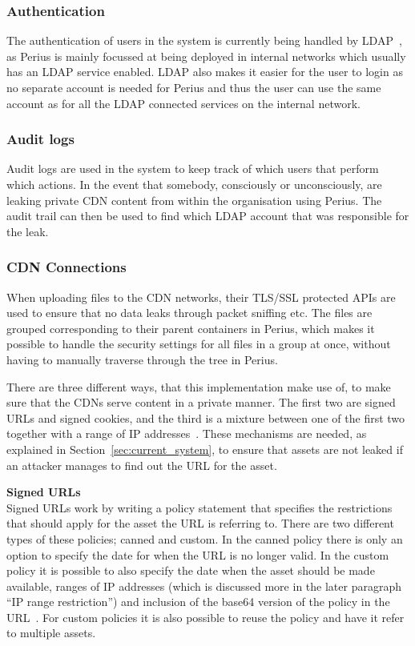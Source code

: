 \documentclass[a4paper,12pt]{article}
\newcounter{subsubsubsection}[subsubsection]
\begin{document}
\subsubsection{Authentication}
The authentication of users in the system is currently being handled by LDAP~\cite{LDAP}, as Perius 
is mainly focussed at being deployed in internal networks which usually has an LDAP service enabled. 
LDAP also makes it easier for the user to login as no separate account is needed for Perius and 
thus the user can use the same account as for all the LDAP connected services on the internal 
network.

\subsubsection{Audit logs}
Audit logs are used in the system to keep track of which users that perform which actions. In the
event that somebody, consciously or unconsciously, are leaking private CDN content from within the
organisation using Perius. The audit trail can then be used to find which LDAP account that was
responsible for the leak.

\subsubsection{CDN Connections} \label{sec:cdn_connections}
When uploading files to the CDN networks, their TLS/SSL protected APIs are used to ensure that no
data leaks through packet sniffing etc. The files are grouped corresponding to their parent
containers in Perius, which makes it possible to handle the security settings for all files in a
group at once, without having to manually traverse through the tree in Perius.

 \label{sec:private_content}
There are three different ways, that this implementation make use of, to make sure that the CDNs
serve content in a private manner. The first two are signed URLs and signed cookies, and the third
is a mixture between one of the first two together with a range of IP addresses~\cite{AWSPRIVATE}.
These mechanisms are needed, as explained in Section~\ref{sec:current_system}, to ensure that assets
are not leaked if an attacker manages to find out the URL for the asset. \\

\par \textbf{Signed URLs} \\
Signed URLs work by writing a policy statement that specifies the restrictions that should apply for
the asset the URL is referring to. There are two different types of these policies; canned and
custom. In the canned policy there is only an option to specify the date for when the URL is no
longer valid. In the custom policy it is possible to also specify the date when the asset should be
made available, ranges of IP addresses (which is discussed more in the later paragraph ``IP range
restriction'') and inclusion of the base64 version of the policy in the URL~\cite{AWSSIGNED}. For
custom policies it is also possible to reuse the policy and have it refer to multiple assets.\\
\end{document}
